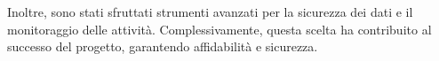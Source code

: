 Inoltre, sono stati sfruttati strumenti avanzati per la sicurezza dei dati e il monitoraggio delle attività.
Complessivamente, questa scelta ha contribuito al successo del progetto, garantendo affidabilità e sicurezza.







\newpage
